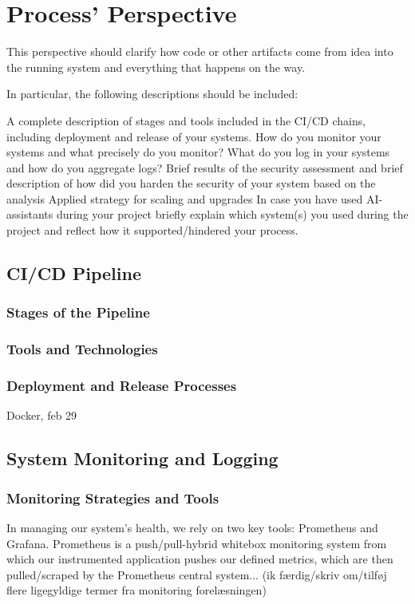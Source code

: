 \section{Process' Perspective}
This perspective should clarify how code or other artifacts come from idea into the running system and everything that happens on the way.

In particular, the following descriptions should be included:

A complete description of stages and tools included in the CI/CD chains, including deployment and release of your systems.
How do you monitor your systems and what precisely do you monitor?
What do you log in your systems and how do you aggregate logs?
Brief results of the security assessment and brief description of how did you harden the security of your system based on the analysis
Applied strategy for scaling and upgrades
In case you have used AI-assistants during your project briefly explain which system(s) you used during the project and reflect how it supported/hindered your process.

\subsection{CI/CD Pipeline}
\subsubsection*{Stages of the Pipeline}
\subsubsection*{Tools and Technologies}
\subsubsection*{Deployment and Release Processes}
Docker, feb 29
\subsection{System Monitoring and Logging}
\subsubsection*{Monitoring Strategies and Tools}
In managing our system's health, we rely on two key tools: Prometheus and Grafana. Prometheus is a push/pull-hybrid whitebox monitoring system from which our instrumented application pushes our defined metrics, which are then pulled/scraped by the Prometheus central system... (ik færdig/skriv om/tilføj flere ligegyldige termer fra monitoring forelæsningen)\\


